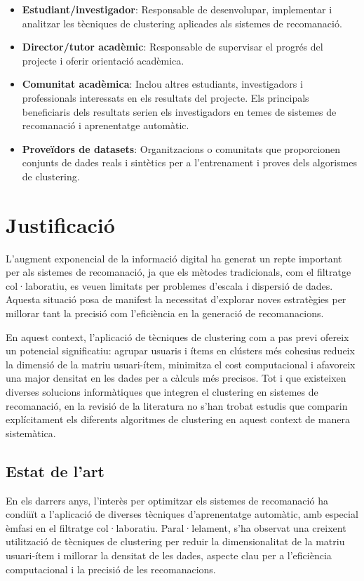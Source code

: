 \documentclass[a4paper,12pt]{report}
\begin{document}
\begin{itemize}
    \item \textbf{Estudiant/investigador}: Responsable de desenvolupar, implementar i analitzar les tècniques de clustering aplicades als sistemes de recomanació.
    \item \textbf{Director/tutor acadèmic}: Responsable de supervisar el progrés del projecte i oferir orientació acadèmica.
    \item \textbf{Comunitat acadèmica}: Inclou altres estudiants, investigadors i professionals interessats en els resultats del projecte. Els principals beneficiaris dels resultats serien els investigadors en temes de sistemes de recomanació i aprenentatge automàtic.
    \item \textbf{Proveïdors de datasets}: Organitzacions o comunitats que proporcionen conjunts de dades reals i sintètics per a l'entrenament i proves dels algorismes de clustering.
\end{itemize}

\section{Justificació}

L'augment exponencial de la informació digital ha generat un repte important per als sistemes de recomanació, ja que els mètodes tradicionals, com el filtratge col·laboratiu, es veuen limitats per problemes d'escala i dispersió de dades.
Aquesta situació posa de manifest la necessitat d'explorar noves estratègies per millorar tant la precisió com l'eficiència en la generació de recomanacions.

En aquest context, l'aplicació de tècniques de clustering com a pas previ ofereix un potencial significatiu: agrupar usuaris i ítems en clústers més cohesius redueix la dimensió de la matriu usuari-ítem, minimitza el cost computacional i afavoreix una major densitat en les dades per a càlculs més precisos.
Tot i que existeixen diverses solucions informàtiques que integren el clustering en sistemes de recomanació, en la revisió de la literatura no s'han trobat estudis que comparin explícitament els diferents algoritmes de clustering en aquest context de manera sistemàtica.

\subsection{Estat de l'art}

En els darrers anys, l'interès per optimitzar els sistemes de recomanació ha condüït a l'aplicació de diverses tècniques d'aprenentatge automàtic, amb especial èmfasi en el filtratge col·laboratiu.
Paral·lelament, s'ha observat una creixent utilització de tècniques de clustering per reduir la dimensionalitat de la matriu usuari-ítem i millorar la densitat de les dades, aspecte clau per a l'eficiència computacional i la precisió de les recomanacions.
\end{document}
